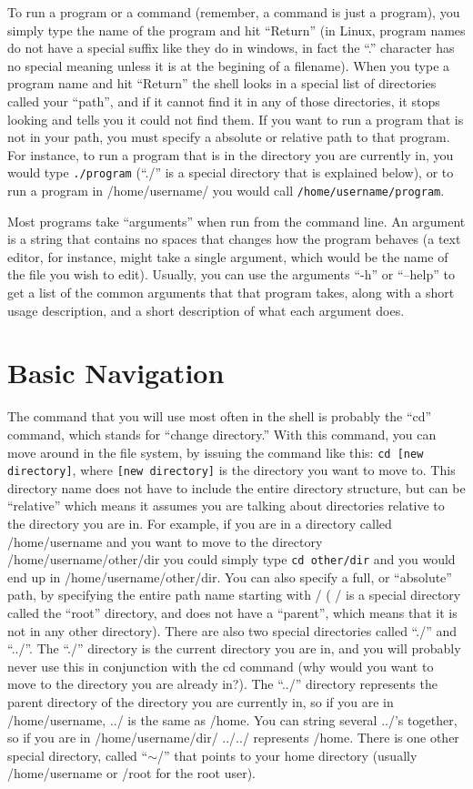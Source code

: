 \documentclass[12pt,letterpaper,oneside, openany]{book} \usepackage[latin1] {inputenc}
\begin{document}
To run a program or a command (remember, a command is just a program), you simply type the name of the program and hit ``Return'' (in Linux, program names do not have a special suffix like they do in windows, in fact the ``.'' character has no special meaning unless it is at the begining of a filename).  When you type a program name and hit ``Return'' the shell looks in a special list of directories called your ``path'', and if it cannot find it in any of those directories, it stops looking and tells you it could not find them.  If you want to run a program that is not in your path, you must specify a absolute or relative path to that program.  For instance, to run a program that is in the directory you are currently in, you would type \verb+./program+ (``./'' is a special directory that is explained below), or to run a program in /home/username/ you would call \verb+/home/username/program+.

Most programs take ``arguments'' when run from the command line.  An argument is a string that contains no spaces that changes how the program behaves (a text editor, for instance, might take a single argument, which would be the name of the file you wish to edit).  Usually, you can use the arguments ``-h'' or ``--help'' to get a list of the common arguments that that program takes, along with a short usage description, and a short description of what each argument does.

\section{Basic Navigation}

The command that you will use most often in the shell is probably the ``cd'' command, which stands for ``change directory.''  With this command, you can move around in the file system, by issuing the command like this: \verb+cd [new directory]+, where \verb+[new directory]+ is the directory you want to move to.  This directory name does not have to include the entire directory structure, but can be ``relative'' which means it assumes you are talking about directories relative to the directory you are in.  For example, if you are in a directory called /home/username and you want to move to the directory /home/username/other/dir you could simply type \verb+cd other/dir+ and you would end up in /home/username/other/dir.  You can also specify a full, or ``absolute'' path, by specifying the entire path name starting with / ( / is a special directory called the ``root'' directory, and does not have a ``parent'', which means that it is not in any other directory).  There are also two special directories called ``./'' and ``../''.  The ``./'' directory is the current directory you are in, and you will probably never use this in conjunction with the cd command (why would you want to move to the directory you are already in?).  The ``../'' directory represents the parent directory of the directory you are currently in, so if you are in /home/username, ../ is the same as /home.  You can string several ../'s together, so if you are in /home/username/dir/ ../../ represents /home.  There is one other special directory, called ``$\sim$/'' that points to your home directory (usually /home/username or /root for the root user).
\end{document}
